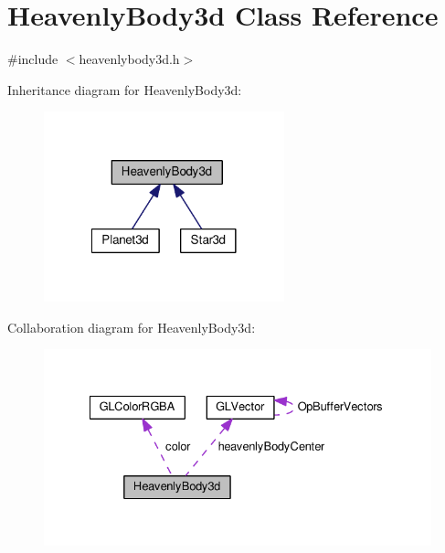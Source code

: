 \hypertarget{classHeavenlyBody3d}{
\section{\-Heavenly\-Body3d \-Class \-Reference}
\label{db/d73/classHeavenlyBody3d}
}


{\ttfamily \#include $<$heavenlybody3d.\-h$>$}



\-Inheritance diagram for \-Heavenly\-Body3d\-:
\nopagebreak
\begin{figure}[H]
\begin{center}
\leavevmode
\includegraphics[width=197pt]{dc/dc8/classHeavenlyBody3d__inherit__graph}
\end{center}
\end{figure}


\-Collaboration diagram for \-Heavenly\-Body3d\-:
\nopagebreak
\begin{figure}[H]
\begin{center}
\leavevmode
\includegraphics[width=331pt]{d0/d69/classHeavenlyBody3d__coll__graph}
\end{center}
\end{figure}

